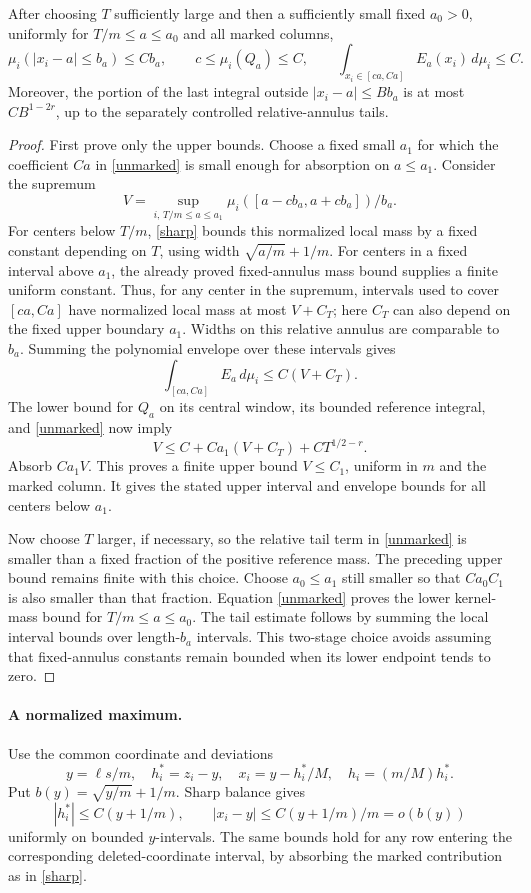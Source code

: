 \documentclass[11pt]{article}
\begin{document}
\begin{lemma}\label{mass}
After choosing $T$ sufficiently large and then a sufficiently small
fixed $a_0>0$, uniformly for $T/m\le a\le a_0$ and all marked columns,
\[
 \mu_i(|x_i-a|\le b_a)\le C b_a,
 \qquad c\le\mu_i(Q_a)\le C,
 \qquad\int_{x_i\in[c a,Ca]}E_a(x_i)\,d\mu_i\le C.
\]
Moreover, the portion of the last integral outside
$|x_i-a|\le B b_a$ is at most $C B^{1-2r}$, up to the separately
controlled relative-annulus tails.
\end{lemma}
\begin{proof}
First prove only the upper bounds. Choose a fixed small $a_1$ for
which the coefficient $Ca$ in \eqref{unmarked} is small enough for
absorption on $a\le a_1$. Consider the supremum
\[
 V=\sup_{i,\,T/m\le a\le a_1}
       \mu_i([a-c b_a,a+c b_a])/b_a.
\]
For centers below $T/m$, \eqref{sharp} bounds this normalized local
mass by a fixed constant depending on $T$, using width
$\sqrt{a/m}+1/m$. For centers in a fixed interval above $a_1$, the
already proved fixed-annulus mass bound supplies a finite uniform
constant. Thus, for any center in the supremum, intervals used to
cover $[ca,Ca]$ have normalized local mass at most $V+C_T$; here
$C_T$ can also depend on the fixed upper boundary $a_1$.
Widths on this relative annulus are comparable to $b_a$.
Summing the polynomial envelope over these intervals gives
\[
 \int_{[ca,Ca]}E_a\,d\mu_i\le C(V+C_T).
\]
The lower bound for $Q_a$ on its central window, its bounded
reference integral, and \eqref{unmarked} now imply
\[
 V\le C+C a_1(V+C_T)+C T^{1/2-r}.
\]
Absorb $C a_1 V$. This proves a finite upper bound $V\le C_1$,
uniform in $m$ and the marked column. It gives the stated upper
interval and envelope bounds for all centers below $a_1$.

Now choose $T$ larger, if necessary, so the relative tail term in
\eqref{unmarked} is smaller than a fixed fraction of the positive
reference mass. The preceding upper bound remains finite with this
choice. Choose $a_0\le a_1$ still smaller so that $C a_0 C_1$ is
also smaller than that fraction. Equation \eqref{unmarked} proves
the lower kernel-mass bound for $T/m\le a\le a_0$.
The tail estimate follows by summing the local interval bounds over
length-$b_a$ intervals. This two-stage choice avoids assuming that
fixed-annulus constants remain bounded when its lower endpoint
tends to zero.
\end{proof}

\paragraph{A normalized maximum.}
Use the common coordinate and deviations
\[
 y=\ell s/m,\quad h_i^*=z_i-y,\quad
 x_i=y-h_i^*/M,\quad h_i=(m/M)h_i^*.
\]
Put $b(y)=\sqrt{y/m}+1/m$. Sharp balance gives
\begin{equation}\label{hbound}
 |h_i^*|\le C(y+1/m),\qquad
 |x_i-y|\le C(y+1/m)/m=o(b(y))
\end{equation}
uniformly on bounded $y$-intervals. The same bounds hold for any row
entering the corresponding deleted-coordinate interval, by absorbing
the marked contribution as in \eqref{sharp}.
\end{document}
